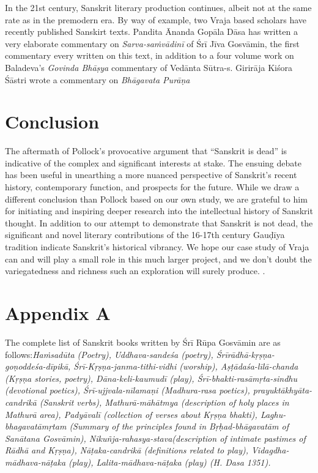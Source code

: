 In the 21st century, Sanskrit literary production continues, albeit not at the same rate as in the premodern era. By way of example, two Vraja based scholars have recently published Sanskirt texts. Pandita Ānanda Gopāla Dāsa has written a very elaborate commentary on {\sl Sarva-saṁvādinī} of Śrī Jīva Gosvāmin, the first commentary every written on this text, in addition to a four volume work on Baladeva’s {\sl Govinda Bhāṣya} commentary of Vedānta Sūtra-s. Girirāja Kiśora Śāstri wrote a commentary on {\sl Bhāgavata Purāṇa}

\section*{Conclusion}

The aftermath of Pollock’s provocative argument that “Sanskrit is dead” is indicative of the complex and significant interests at stake. The ensuing debate has been useful in unearthing a more nuanced perspective of Sanskrit’s recent history, contemporary function, and prospects for the future. While we draw a different conclusion than Pollock based on our own study, we are grateful to him for initiating and inspiring deeper research into the intellectual history of Sanskrit thought. In addition to our attempt to demonstrate that Sanskrit is not dead, the significant and novel literary contributions of the 16-17th century Gauḍīya tradition indicate Sanskrit’s historical vibrancy. We hope our case study of Vraja can and will play a small role in this much larger project, and we don’t doubt the variegatedness and richness such an exploration will surely produce. .


\section*{Appendix A}

The complete list of Sanskrit books written by Śrī Rūpa Gosvāmin are as follows:{\sl  Haṁsadūta {\rm (Poetry)}, Uddhava-sandeśa {\rm (poetry)}, Śrīrādhā-\Break kṛṣṇa-goṇoddeśa-dīpikā, Śrī-Kṛṣṇa-janma-tithi-vidhi {\rm (worship)}, Aṣṭādaśa-\Break līlā-chanda {\rm (Kṛṣṇa stories, poetry)}, Dāna-keli-kaumudī {\rm (play)}, Śrī-bhakti-rasāmṛta-sindhu {\rm (devotional poetics)}, Śrī-ujjvala-nīlamaṇi {\rm (Madhura-\Break rasa poetics)}, prayuktākhyāta-candrikā {\rm (Sanskrit verbs)}, Mathurā-\Break māhātmya {\rm (description of holy places in Mathurā area)}, Padyāvalī {\rm (collection of verses about Kṛṣṇa bhakti)}, Laghu-bhagavatāmṛtam {\rm (Summary of the principles found in Bṛḥad-bhāgavatām of Sanātana Gosvāmin)}, Nikuñja-rahasya-stava{\rm (description of intimate pastimes of Rādhā and Kṛṣṇa)}, Nāṭaka-candrikā {\rm (definitions related to play)}, Vidagdha-mādha\-va-nāṭaka {\rm (play)}, Lalita-mādhava-nāṭaka {\rm (play)} {\rm (H. Dasa 1351)}.}

